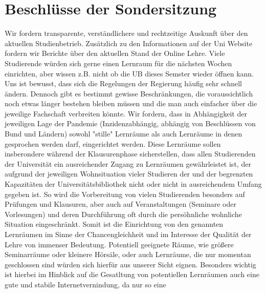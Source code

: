 \section{Beschlüsse der Sondersitzung}
    {
        Wir fordern transparente, verständlichere und rechtzeitige Auskunft über den
        aktuellen
        Studienbetrieb. Zusätzlich zu den Informationen auf der Uni Website fordern wir
        Berichte über den
        aktuellen Stand der Online Lehre. Viele Studierende würden sich gerne einen Lernraum
        für die
        nächsten Wochen einrichten, aber wissen z.B. nicht ob die UB dieses Semster wieder
        öffnen kann.
        Uns ist bewusst, dass sich die Regelungen der Regierung häufig sehr schnell ändern.
        Dennoch gibt
        es bestimmt gewisse Beschränkungen, die voraussichtlich noch etwas länger bestehen
        bleiben
        müssen und die man auch einfacher über die jeweilige Fachschaft verbreiten könnte.
        Wir fordern, dass in Abhängigkeit der jeweiligen Lage der Pandemie (Inzidenzabhängig,
        abhängig
        von Beschlüssen von Bund und Ländern) sowohl "stille" Lernräume als auch Lernräume in
        denen
        gesprochen werden darf, eingerichtet werden. Diese Lernräume sollen insberondere
        während der
        Klausurenphase sicherstellen, dass allen Studierenden der Universität ein
        ausreichender Zugang zu 
        Lernräumen gewährleistet ist, der aufgrund der jeweiligen Wohnsituation vieler
        Studieren der und
        der begrenzten Kapazitäten der Universitätsbibliothek nicht oder nicht in
        ausreichendem Umfang
        gegeben ist. So wird die Vorbereitung von vielen Studierenden besonders auf Prüfungen
        und
        Klausuren, aber auch auf Veranstaltungen (Seminare oder Vorlesungen) und deren
        Durchführung oft
        durch die persöhnliche wohnliche Situation eingeschränkt. Somit ist die Einrichtung
        von den
        genannten Lernräumen im Sinne der Chancengleichheit und im Interesse der Qualität der
        Lehre von
        immenser Bedeutung. Potentiell geeignete Räume, wie größere Seminarräume oder
        kleinere
        Hörsäle, oder auch Lernräume, die nur momentan geschlossen sind würden sich hierfür
        aus unserer
        Sicht eignen. Besonders wichtig ist hierbei im Hinblick auf die Gesatltung von
        potentiellen
        Lernräumen auch eine gute und stabile Internetvernindung, da nur so eine
}
